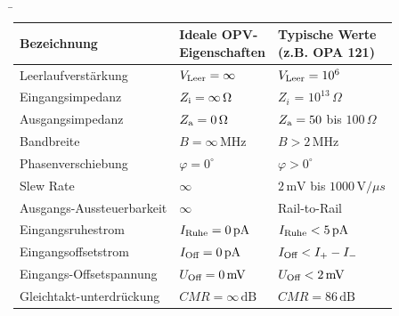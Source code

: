 \begin{frame}
    \b{
        \begin{tabular}{|L{4cm}|L{4cm}|L{4cm}|}
            \hline
            \textbf{Bezeichnung}                & \textbf{Ideale OPV- \newline Eigenschaften} & \textbf{Typische Werte \newline (z.B. OPA 121)} \\
            \hline
            Leerlaufverstärkung                 & $V_{\textnormal{Leer}} = \infty$            & $V_{\textnormal{Leer}} = 10^6$                  \\
            \hline
            Eingangsimpedanz                    & $Z_{\textnormal{i}} = \infty\,\Omega$       & $Z_i$ = $10^{13}\,\Omega$                       \\
            \hline
            Ausgangsimpedanz                    & $Z_{\textnormal{a}} = 0\,\Omega$            & $Z_{\textnormal{a}} = 50$ bis $100\,\Omega$     \\
            \hline
            Bandbreite                          & $B = \infty\,\mathrm{MHz}$                  & $B > 2\,\mathrm{MHz}$                           \\
            \hline
            Phasenverschiebung                  & $\varphi=0^{\circ}$                         & $\varphi >0^{\circ}$                            \\
            \hline
            Slew Rate                           & $\infty$                                    & $2\,\mathrm{mV}$ bis $1000\,\mathrm{V}/\mu s$   \\
            \hline
            Ausgangs-Aussteuerbarkeit           & $\infty$                                    & Rail-to-Rail                                    \\
            \hline
            Eingangsruhestrom                   & $I_{\textnormal{Ruhe}} = 0\,\mathrm{pA}$    & $I_{\textnormal{Ruhe}} < 5\,\mathrm{pA} $       \\
            \hline
            Eingangsoffsetstrom                 & $I_{\textnormal{Off}} = 0\,\mathrm{pA}$     & $I_{\textnormal{Off}} < I_+-I_-$                \\
            \hline
            Eingangs-Offsetspannung             & $U_{\textnormal{Off}} = 0\,\mathrm{mV}$     & $U_{\textnormal{Off}} < 2\,\mathrm{mV}$         \\
            \hline
            Gleichtakt-\linebreak unterdrückung & $CMR = \infty\,\mathrm{dB}$                 & $CMR=86\,\mathrm{dB}$                           \\

\end{tabular}}
\end{frame}
